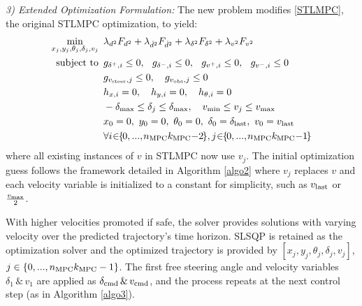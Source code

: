 \documentclass[journal]{IEEEtran}
\begin{document}
\indent \textit{3) Extended Optimization Formulation:}
The new problem modifies \eqref{STLMPC}, the original STLMPC optimization, to yield:
\vspace{-2pt}
\begin{equation}
\begin{aligned}
\min_{x_j,y_j,\theta_j,\delta_j,v_j} \quad\!\!\! & \lambda_{d^2}F_{d^2}+\lambda_{\dot d^2}F_{\dot d^2}+\lambda_{\delta^2}F_{\delta^2}+\lambda_{v^2}F_{v^2} \\
\text{subject to} \quad\!\!\! & g_{\delta^+,i}\leq0,\mkern-5mu\quad g_{\delta^-,i}\leq0,\mkern-5mu\quad g_{v^+,i}\leq0,\mkern-5mu\quad g_{v^-,i}\leq0\\                                    &g_{v_\textup{steer},j}\leq0,\quad g_{v_\textup{obs},j}\leq0 \\
                        & h_{x,i}=0, \quad h_{y,i}=0,\quad h_{\theta,i}=0\\
                        & -\delta_\textup{max}\leq\delta_j\leq\delta_\textup{max},\quad v_\textup{min}\leq v_j\leq v_\textup{max}\\
                        & x_0=0,\ y_0=0,\ \theta_0=0,\ \delta_0=\delta_\textup{last},\ v_0=v_\textup{last}\\
                        & \forall i\!\mkern-1mu\in\!\! \{\mkern-2mu0,...,\mkern-1.5mun_\textup{MPC}k_\textup{MPC}\mkern-1mu\!-\!\mkern-1mu2\mkern-2mu\},j\!\mkern-1mu\in\!\! \{\mkern-2mu0,...,\mkern-1.5mun_\textup{MPC}k_\textup{MPC}\mkern-1mu\!-\!\mkern-1mu1\mkern-2mu\}
\end{aligned}
\label{NonUniformV-STLMPC}
\end{equation}
where all existing instances of $v$ in STLMPC now use $v_j$. The initial optimization guess follows the framework detailed in Algorithm \ref{algo2} where $v_j$ replaces $v$ and each velocity variable is initialized to a constant for simplicity, such as $v_\textup{last}$ or $\frac{v_\textup{max}}{2}$.

With higher velocities promoted if safe, the solver provides solutions with varying velocity over the predicted trajectory's time horizon. SLSQP is retained as the optimization solver and the optimized trajectory is provided by $[x_j,y_j,\theta_j,\delta_j,v_j],$ \mbox{$j\in\{0,...,n_\textup{MPC}k_\textup{MPC}-1\}$}. The first free steering angle and velocity variables $\delta_1\,\&\,v_1$ are applied as $\delta_\textup{cmd}\,\&\,v_\textup{cmd}$, and the process repeats at the next control step (as in Algorithm \ref{algo3}).
\end{document}
